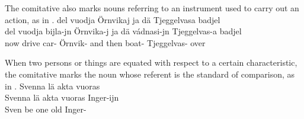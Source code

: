 The comitative also marks nouns referring to an instrument used to carry out an action, as in .
\ea\label{com2}
\glll	del vuodja  Örnvikaj ja dä  Tjeggelvasa badjel\\
	del vuodja bijla-jn Örnvika-j ja dä vádnasi-jn Tjeggelvas-a badjel\\
	now drive\BS{} car- Örnvik- and then boat- Tjeggelvas- over\\\nopagebreak
{} 
\z

When two persons or things are equated with respect to a certain characteristic, the comitative marks the noun whose referent is the standard of comparison, as in .
\ea\label{com3}
\glll	Svenna lä akta vuoras \\
	Svenna lä akta vuoras Inger-ijn\\
	Sven\BS{} be\BS{} one old Inger-\\\nopagebreak
{} 
\z


